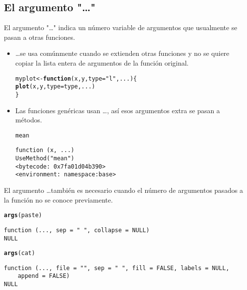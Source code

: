 \documentclass{article}\usepackage[]{graphicx}\usepackage[]{color}
\makeatletter
\newcommand{\hlstr}[1]{\textcolor[rgb]{0.192,0.494,0.8}{#1}}%
\newcommand{\hlstd}[1]{\textcolor[rgb]{0.345,0.345,0.345}{#1}}%
\newcommand{\hlkwa}[1]{\textcolor[rgb]{0.161,0.373,0.58}{\textbf{#1}}}%
\newcommand{\hlkwb}[1]{\textcolor[rgb]{0.69,0.353,0.396}{#1}}%
\newcommand{\hlkwc}[1]{\textcolor[rgb]{0.333,0.667,0.333}{#1}}%
\newcommand{\hlkwd}[1]{\textcolor[rgb]{0.737,0.353,0.396}{\textbf{#1}}}%
\newenvironment{kframe}{%
 \def\at@end@of@kframe{}%
 \ifinner\ifhmode%
  \def\at@end@of@kframe{\end{minipage}}%
  \begin{minipage}{\columnwidth}%
 \fi\fi%
 \def\FrameCommand##1{\hskip\@totalleftmargin \hskip-\fboxsep
 \colorbox{shadecolor}{##1}\hskip-\fboxsep
     \hskip-\linewidth \hskip-\@totalleftmargin \hskip\columnwidth}%
 \MakeFramed {\advance\hsize-\width
   \@totalleftmargin\z@ \linewidth\hsize
   \@setminipage}}%
 {\par\unskip\endMakeFramed%
 \at@end@of@kframe}
\newenvironment{knitrout}{}{} %
\makeatother
\begin{document}
  \subsection{El argumento "\dots"}
  El argumento "\dots" indica un número variable de argumentos que usualmente se pasan a otras funciones.
  \begin{itemize}
    \item \dots se usa comúnmente cuando se extienden otras funciones y no se quiere copiar la lista entera de argumentos de la función original.
\begin{knitrout}
\color{fgcolor}\begin{kframe}
\begin{alltt}
  \hlstd{myplot} \hlkwb{<-} \hlkwa{function}\hlstd{(}\hlkwc{x}\hlstd{,} \hlkwc{y}\hlstd{,} \hlkwc{type} \hlstd{=} \hlstr{"l"}\hlstd{,} \hlkwc{...}\hlstd{)\{}
    \hlkwd{plot}\hlstd{(x, y,} \hlkwc{type} \hlstd{= type, ...)}
  \hlstd{\}}
\end{alltt}
\end{kframe}
\end{knitrout}
    \item Las funciones genéricas usan \dots, así esos argumentos extra se pasan a métodos.
\begin{knitrout}
\color{fgcolor}\begin{kframe}
\begin{alltt}
  \hlstd{mean}
\end{alltt}
\begin{verbatim}
function (x, ...) 
UseMethod("mean")
<bytecode: 0x7fa01d04b390>
<environment: namespace:base>
\end{verbatim}
\end{kframe}
\end{knitrout}
  \end{itemize}

  El argumento \dots también es necesario cuando el número de argumentos pasados a la función no se conoce previamente.
\begin{knitrout}
\color{fgcolor}\begin{kframe}
\begin{alltt}
  \hlkwd{args}\hlstd{(paste)}
\end{alltt}
\begin{verbatim}
function (..., sep = " ", collapse = NULL) 
NULL
\end{verbatim}
\begin{alltt}
  \hlkwd{args}\hlstd{(cat)}
\end{alltt}
\begin{verbatim}
function (..., file = "", sep = " ", fill = FALSE, labels = NULL, 
    append = FALSE) 
NULL
\end{verbatim}
\end{kframe}
\end{knitrout}
  
\end{document}
